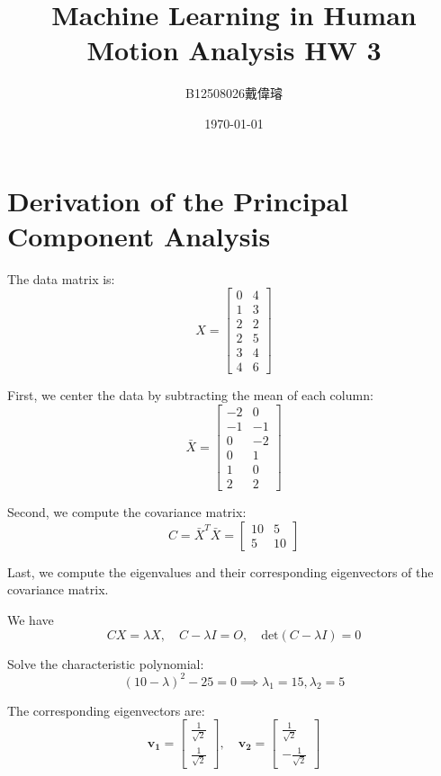 \documentclass[12pt,a4paper]{article}
\title{Machine Learning in Human Motion Analysis HW 3}
\author{B12508026戴偉璿}
\date{\today}
\begin{document}
\maketitle


\section{Derivation of the Principal Component Analysis}

The data matrix is:
$$
X = \begin{bmatrix} 0 & 4 \\ 1 & 3 \\ 2 & 2 \\ 2 & 5 \\ 3 & 4 \\ 4 & 6 \end{bmatrix}
$$

First, we center the data by subtracting the mean of each column:
$$
\bar{X} = \begin{bmatrix} -2 & 0 \\ -1 & -1 \\ 0 & -2 \\ 0 & 1 \\ 1 & 0 \\ 2 & 2 \end{bmatrix}
$$

Second, we compute the covariance matrix:
$$
C = \bar{X}^T \bar{X} = \begin{bmatrix} 10 & 5 \\ 5 & 10 \end{bmatrix}
$$  

Last, we compute the eigenvalues and their corresponding eigenvectors of the covariance matrix.

We have 
$$
CX = \lambda X,\quad C-\lambda I = O,\quad \text{det}(C-\lambda I) = 0 
$$

Solve the characteristic polynomial:
$$
(10-\lambda)^2 - 25 = 0 \implies \lambda_1 = 15, \lambda_2 = 5
$$

The corresponding eigenvectors are:
$$
\mathbf{v_1} = \begin{bmatrix} \frac{1}{\sqrt{2}} \\ \frac{1}{\sqrt{2}} \end{bmatrix},\quad \mathbf{v_2} = \begin{bmatrix} \frac{1}{\sqrt{2}} \\ -\frac{1}{\sqrt{2}} \end{bmatrix}
$$
\end{document}

